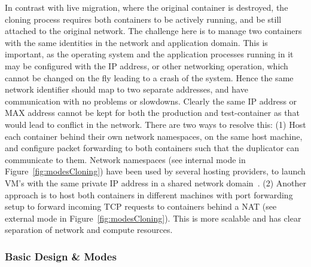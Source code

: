 In contrast with live migration, where the original container is destroyed, the cloning process requires both containers to be actively running, and be still attached to the original network.
The challenge here is to manage two containers with the same identities in the network and application domain. 
This is important, as the operating system and the application processes running in it may be configured with the IP address, or other networking operation, which cannot be changed on the fly leading to a crash of the system.
Hence the same network identifier should map to two separate addresses, and have communication with no problems or slowdowns.
\iffalse
Clearly the same IP address or MAX address cannot be kept for both the production and test-container as that would lead to conflict in the network. 
There are two ways to resolve this: 
(1) Host each container behind their own network namespaces, on the same host machine, and configure packet forwarding to both containers such that the duplicator can communicate to them. 
Network namespaces (see internal mode in Figure~\ref{fig:modesCloning}) 
have been used by several hosting providers, to launch VM's with the 
same private IP address in a shared network domain~\cite{OpenStack}. 
(2) Another approach is to host both containers in different machines with port forwarding setup to forward incoming TCP requests to containers behind a NAT (see external mode in Figure~\ref{fig:modesCloning}). 
This is more scalable and has clear separation of network and compute resources. 


\subsubsection{Basic Design \& Modes}

